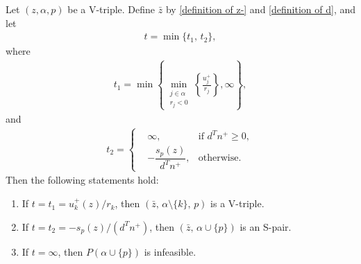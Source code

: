 \documentclass[10pt,a4paper]{amsart}
\begin{document}
	\begin{theorem}\label{V-tri z}
		Let $(z, \alpha, p)$ be a V-triple. Define $\bar{z}$ by \eqref{definition of z-} and \eqref{definition of d}, and let
		\begin{align}\label{definition of t}
			t = \min\{t_{1},\, t_{2}\},
		\end{align}
		where
		\begin{align}\label{definition of t1}
			t_{1} = \min\left\lbrace\min_{\substack{j \in \alpha\\ r_{j} < 0}} \left\lbrace\frac{u_{j}^{+}}{r_{j}}\right\rbrace, \infty \right\rbrace,
		\end{align}
		and
		\begin{align}\label{definition of t2}
			t_{2} =
			\left\lbrace\begin{aligned}
				&\infty, & \text{if } d^{T} n^{+} \geq 0,\\
				&-\dfrac{s_{p}(z)}{d^{T}n^{+}}, & \text{otherwise.}
			\end{aligned}\right.
		\end{align}
		Then the following statements hold:
		\begin{enumerate}
			\item If $t = t_{1} = u_{k}^{+}(z) / r_{k}$, then $(\bar{z},\, \alpha \setminus \{k\},\, p)$ is a V-triple.
			\item If $t = t_{2} = -s_{p}(z)/(d^{T}n^{+})$, then $(\bar{z},\, \alpha \cup \{p\})$ is an S-pair.
			\item If $t = \infty$, then $P(\alpha \cup \{p\})$ is infeasible.
		\end{enumerate}
	\end{theorem}
\end{document}
